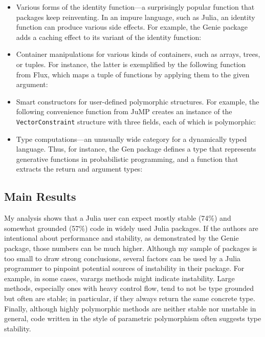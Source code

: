 \documentclass[oneside,openright,titlepage,numbers=noenddot,%
headinclude,footinclude,cleardoublepage=empty,abstract=on,
BCOR=5mm,paper=a4,fontsize=11pt,
dvipsnames
]{scrreprt}
\renewcommand{\c}[1]{\lstinline[language=Julia]!#1!\xspace}
\begin{document}
\begin{itemize}
\item
  Various forms of the identity function---a surprisingly popular function that
  packages keep reinventing. In an impure language, such as Julia, an identity
  function can produce various side effects.
  For example, the Genie package adds a caching effect to
  its variant of the identity function:

\item
  Container manipulations for various kinds of containers, such as arrays, trees, or
  tuples. For instance, the latter is exemplified by the following function
  from Flux, which maps a tuple of functions by applying them to the given argument:

\item
  Smart constructors for user-defined polymorphic structures. For example, the following
  convenience function from JuMP creates an instance of the
  \c{VectorConstraint} structure with three fields, each of which is polymorphic:

\item
  Type computations---an unusually wide category for a dynamically typed
  language. Thus, for instance, the Gen package defines a type that represents generative
  functions in probabilistic programming, and a function that extracts the
  return and argument types:

\end{itemize}

\subsection{Main Results}

My analysis shows that a Julia user can expect mostly stable (74\%) and
somewhat grounded (57\%) code in widely used Julia packages. If the authors
are intentional about performance and stability, as demonstrated by the Genie
package, those numbers can be much higher. Although my sample of packages is
too small to draw strong conclusions, several factors can be
used by a Julia programmer to pinpoint potential sources of instability in their
package. For example, in some cases, varargs methods might indicate instability.
Large methods, especially ones with heavy control flow,
tend to not be type grounded but often are stable; in particular,
if they always return the same concrete type.
Finally, although highly polymorphic methods are neither stable nor unstable
in general, code written in the style of parametric polymorphism
often suggests type stability.
\end{document}
